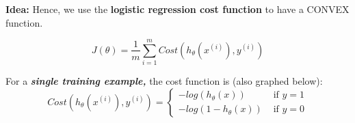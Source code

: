 \documentclass{article}
\begin{document}
\begin{mybox}
    \textbf{Idea:} Hence, we use the \textbf{logistic regression cost function }to have a CONVEX function.

    
    \begin{equation}
        J(\theta) = \frac{1}{m} \sum_{i=1}^{m} Cost \left(h_{\theta} (x^{(i)}), y^{(i)}\right)
    \end{equation}


    For a \textbf{\textit{single training example,}} the cost function is (also graphed below):
    \begin{equation}
        Cost \left(h_{\theta} (x^{(i)}), y^{(i)} \right) = \left\{
        \begin{array}{ll}
        -log \left(h_{\theta} (x) \right) & \text{ if } y = 1 \\
        -log \left(1 - h_{\theta} (x) \right) & \text{ if } y = 0
        \end{array} \right.
    \end{equation}
    
    
    
    
    
    
    
    \hskip 5pt

        
    
    
    
\end{mybox}
\end{document}
